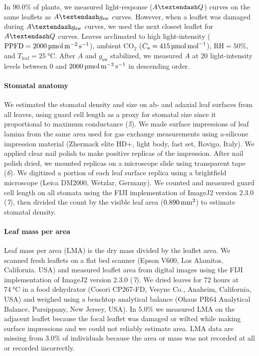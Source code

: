 \documentclass[
  letterpaper,
  DIV=11,
  numbers=noendperiod]{scrartcl}
\let\oldparagraph\paragraph
\renewcommand{\paragraph}[1]{\oldparagraph{#1}\mbox{}}
\newcommand{\agcurve}{$A \textendash g_\text{sw}$}
\newcommand{\aqcurve}{$A \textendash Q$}
\newcommand{\caequals}[1]{$C_\mathrm{a} = \qty{#1}{\micro\mol\raiseto{-1}\mol}$}
\newcommand{\gsw}{$g_\text{sw}$}
\newcommand{\ppfdequals}[1]{$\mathrm{PPFD} = \qty{#1}{\micro\mol\raiseto{-2}\meter\raiseto{-1}\second}$}
\newcommand{\rhequals}[1]{$\mathrm{RH} = #1\%$}
\newcommand{\tleafequals}[1]{$T_\mathrm{leaf} = \qty{#1}{\degreeCelsius}$}
\begin{document}
In 90.0\% of plants, we measured light-response (\aqcurve) curves on the
same leaflets as \agcurve{} curves. However, when a leaflet was damaged
during \agcurve{} curves, we used the next closest leaflet for
\aqcurve{} curves. Leaves acclimated to high light-intensity
(\ppfdequals{2000}), ambient CO\(_2\) (\caequals{415}), \rhequals{50},
and \tleafequals{25}. After \(A\) and \gsw{} stabilized, we measured
\(A\) at 20 light-intensity levels between \(0\) and
\(\qty{2000}{\micro\mol\raiseto{-2}\meter\raiseto{-1}\second}\) in
descending order.

\paragraph{Stomatal anatomy}\label{stomatal-anatomy}

We estimated the stomatal density and size on ab- and adaxial leaf
surfaces from all leaves, using guard cell length as a proxy for
stomatal size since it proportional to maximum conductance (\emph{5}).
We made surface impressions of leaf lamina from the same area used for
gas exchange measurements using a-silicone impression material (Zhermack
elite HD+, light body, fast set, Rovigo, Italy). We applied clear nail
polish to make positive replicas of the impression. After nail polish
dried, we mounted replicas on a microscope slide using transparent tape
(\emph{6}). We digitized a portion of each leaf surface replica using a
brightfield microscope (Leica DM2000, Wetzlar, Germany). We counted and
measured guard cell length on all stomata using the FIJI implementation
of ImageJ2 version 2.3.0 (\emph{7}), then divided the count by the
visible leaf area (\(\qty{0.890}{\raiseto{2}\milli\meter}\)) to estimate
stomatal density.

\paragraph{Leaf mass per area}\label{leaf-mass-per-area}

Leaf mass per area (LMA) is the dry mass divided by the leaflet area. We
scanned fresh leaflets on a flat bed scanner (Epson V600, Los Alamitos,
California. USA) and measured leaflet area from digital images using the
FIJI implementation of ImageJ2 version 2.3.0 (\emph{7}). We dried leaves
for 72 hours at \(\qty{74}{\degreeCelsius}\) in a food dehydrator
(Cosori CP267-FD, Vesync Co., Anaheim, California, USA) and weighed
using a benchtop analytical balance (Ohaus PR64 Analytical Balance,
Parsippany, New Jersey, USA). In \(5.0\%\) we measured LMA on the
adjacent leaflet because the focal leaflet was damaged or wilted while
making surface impressions and we could not reliably estimate area. LMA
data are missing from \(3.0\%\) of individuals because the area or mass
was not recorded at all or recorded incorrectly.
\end{document}
